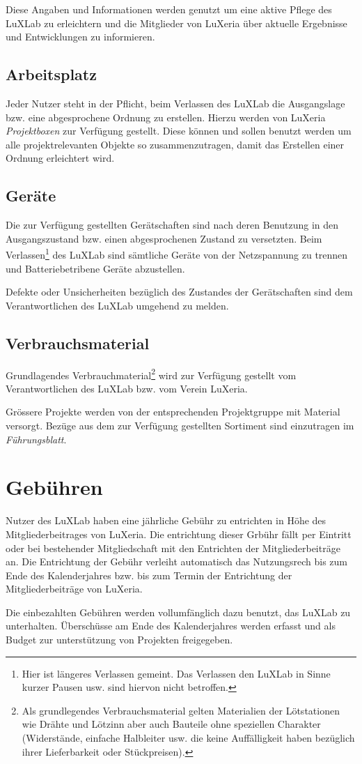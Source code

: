 \documentclass[a4paper,
               10pt,
               fleqn]{article}
\begin{document}
Diese Angaben und Informationen werden genutzt um eine aktive Pflege des
LuXLab zu erleichtern und die Mitglieder von LuXeria über aktuelle
Ergebnisse und Entwicklungen zu informieren.

\subsection{Arbeitsplatz}
Jeder Nutzer steht in der Pflicht, beim Verlassen des LuXLab die
Ausgangslage bzw. eine abgesprochene Ordnung zu erstellen. Hierzu
werden von LuXeria \emph{Projektboxen} zur Verfügung gestellt. Diese
können und sollen benutzt werden um alle projektrelevanten Objekte 
so zusammenzutragen, damit das Erstellen einer Ordnung erleichtert wird.
 
\subsection{Geräte}
Die zur Verfügung gestellten Gerätschaften sind nach deren Benutzung in
den Ausgangszustand bzw. einen abgesprochenen Zustand zu versetzten.
Beim Verlassen\footnote{
    Hier ist längeres Verlassen gemeint. Das Verlassen den LuXLab in 
    Sinne kurzer Pausen usw. sind hiervon nicht betroffen.}
des LuXLab sind sämtliche Geräte von der Netzspannung zu trennen und 
Batteriebetribene Geräte abzustellen.

Defekte oder Unsicherheiten bezüglich des Zustandes der Gerätschaften 
sind dem Verantwortlichen des LuXLab umgehend zu melden.

\subsection{Verbrauchsmaterial}
Grundlagendes Verbrauchmaterial\footnote{
    Als grundlegendes Verbrauchsmaterial gelten Materialien der
    Lötstationen wie Drähte und Lötzinn aber auch Bauteile ohne
    speziellen Charakter (Widerstände, einfache Halbleiter usw. 
    die keine Auffälligkeit haben bezüglich ihrer Lieferbarkeit
    oder Stückpreisen).}
wird zur Verfügung gestellt vom Verantwortlichen des LuXLab bzw.
vom Verein LuXeria.

Grössere Projekte werden von der entsprechenden Projektgruppe
mit Material versorgt. Bezüge aus dem zur Verfügung gestellten 
Sortiment sind einzutragen im \emph{Führungsblatt}.

\section{Gebühren}
Nutzer des LuXLab haben eine jährliche Gebühr zu entrichten in
Höhe des Mitgliederbeitrages von LuXeria.
Die entrichtung dieser Grbühr fällt per Eintritt oder bei
bestehender Mitgliedschaft mit den Entrichten der
Mitgliederbeiträge an. Die Entrichtung der Gebühr verleiht
automatisch das Nutzungsrech bis zum Ende des Kalenderjahres
bzw. bis zum Termin der Entrichtung der Mitgliederbeiträge 
von LuXeria.

Die einbezahlten Gebühren werden vollumfänglich dazu benutzt, 
das LuXLab zu unterhalten. Überschüsse am Ende des Kalenderjahres 
werden erfasst und als Budget zur unterstützung von Projekten
freigegeben.

\end{document}

